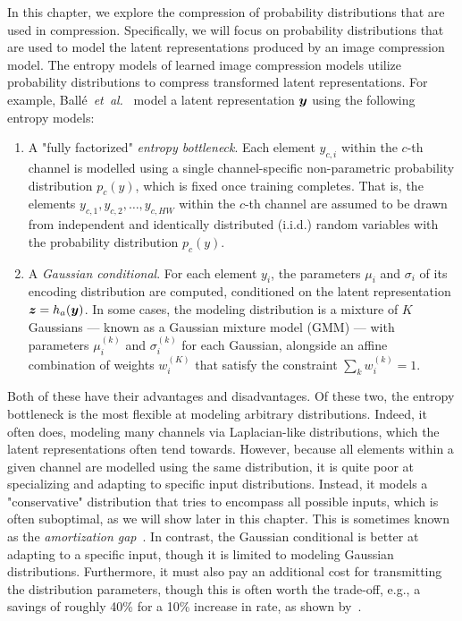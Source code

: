 In this chapter, we explore the compression of probability distributions that are used in compression.
Specifically, we will focus on probability distributions that are used to model the latent representations produced by an image compression model.
The entropy models of learned image compression models utilize probability distributions to compress transformed latent representations.
For example, Ballé~\emph{et~al.}~\cite{balle2018variational} model a latent representation ${\boldsymbol{y}}$ using the following entropy models:
\begin{enumerate}
  \item
    A "fully factorized" \emph{entropy bottleneck}.
    Each element ${y}_{c,i}$ within the $c$-th channel is modelled using a single channel-specific non-parametric probability distribution ${p}_{c}(y)$, which is fixed once training completes.
    That is, the elements ${y}_{c,1}, {y}_{c,2}, \ldots, {y}_{c,H W}$ within the $c$-th channel are assumed to be drawn from independent and identically distributed (i.i.d.) random variables with the probability distribution ${p}_c(y)$.
  \item
    A \emph{Gaussian conditional}.
    For each element ${y}_{i}$, the parameters ${\mu}_{i}$ and ${\sigma}_{i}$ of its encoding distribution are computed, conditioned on the latent representation ${\boldsymbol{z}} = h_a({\boldsymbol{y}})$.
    In some cases, the modeling distribution is a mixture of $K$ Gaussians --- known as a Gaussian mixture model (GMM) --- with parameters ${\mu}_{i}^{(k)}$ and ${\sigma}_{i}^{(k)}$ for each Gaussian, alongside an affine combination of weights ${w}_{i}^{(K)}$ that satisfy the constraint $\sum_k {w}_{i}^{(k)} = 1$.
\end{enumerate}
Both of these have their advantages and disadvantages.
Of these two, the entropy bottleneck is the most flexible at modeling arbitrary distributions.
Indeed, it often does, modeling many channels via Laplacian-like distributions, which the latent representations often tend towards.
However, because all elements within a given channel are modelled using the same distribution, it is quite poor at specializing and adapting to specific input distributions.
Instead, it models a "conservative" distribution that tries to encompass all possible inputs, which is often suboptimal, as we will show later in this chapter.
This is sometimes known as the \emph{amortization gap}~\cite{balcilar2022amortizationgap,cremer2018inferencesuboptimality}.
In contrast, the Gaussian conditional is better at adapting to a specific input, though it is limited to modeling Gaussian distributions.
Furthermore, it must also pay an additional cost for transmitting the distribution parameters, though this is often worth the trade-off, e.g., a savings of roughly 40\% for a 10\% increase in rate, as shown by~\cite{balle2018variational}.

